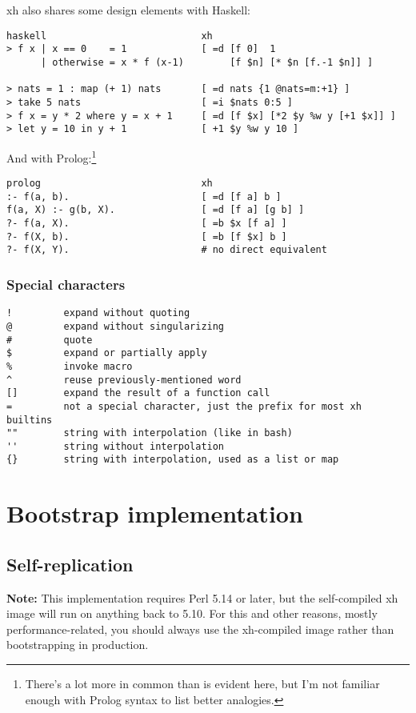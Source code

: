 \documentclass{report}
\begin{document}
    \noindent xh also shares some design elements with Haskell:

\begin{verbatim}
haskell                           xh
> f x | x == 0    = 1             [ =d [f 0]  1
      | otherwise = x * f (x-1)        [f $n] [* $n [f.-1 $n]] ]

> nats = 1 : map (+ 1) nats       [ =d nats {1 @nats=m:+1} ]
> take 5 nats                     [ =i $nats 0:5 ]
> f x = y * 2 where y = x + 1     [ =d [f $x] [*2 $y %w y [+1 $x]] ]
> let y = 10 in y + 1             [ +1 $y %w y 10 ]
\end{verbatim}

    \noindent And with Prolog:\footnote{There's a lot more in common than is
    evident here, but I'm not familiar enough with Prolog syntax to list better
    analogies.}

\begin{verbatim}
prolog                            xh
:- f(a, b).                       [ =d [f a] b ]
f(a, X) :- g(b, X).               [ =d [f a] [g b] ]
?- f(a, X).                       [ =b $x [f a] ]
?- f(X, b).                       [ =b [f $x] b ]
?- f(X, Y).                       # no direct equivalent
\end{verbatim}

\section{Special characters}\label{sec:special-characters}
\begin{verbatim}
!         expand without quoting
@         expand without singularizing
#         quote
$         expand or partially apply
%         invoke macro
^         reuse previously-mentioned word
[]        expand the result of a function call
=         not a special character, just the prefix for most xh builtins
""        string with interpolation (like in bash)
''        string without interpolation
{}        string with interpolation, used as a list or map
\end{verbatim}

\part{Bootstrap implementation}\label{part:bootstrap-implementation}
\chapter{Self-replication}\label{chp:self-replication}
  {\bf Note:} This implementation requires Perl 5.14 or later, but the
  self-compiled xh image will run on anything back to 5.10. For this and other
  reasons, mostly performance-related, you should always use the xh-compiled
  image rather than bootstrapping in production.
\end{document}
